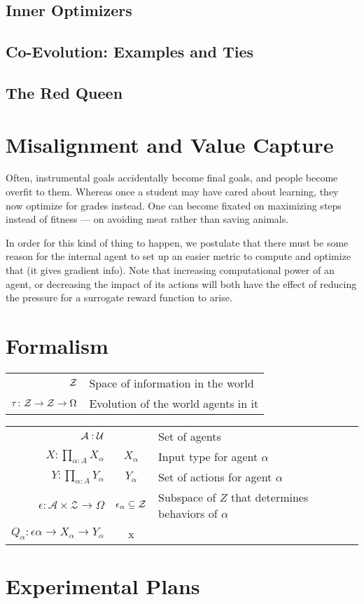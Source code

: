 \documentclass{article}
\theoremstyle{definition}
\newcommand{\Z}{\mathcal Z}
\begin{document}
	\subsection{Inner Optimizers}
	\subsection{Co-Evolution: Examples and Ties}
	\subsection{The Red Queen}
	
	\section{Misalignment and Value Capture}
	Often, instrumental goals accidentally become final goals, and people become overfit to them. Whereas once a student may have cared about learning, they now optimize for grades instead. One can become fixated on maximizing steps instead of fitness --- on avoiding meat rather than saving animals. 
	
	In order for this kind of thing to happen, we postulate that there must be some reason for the internal agent to set up an easier metric to compute and optimize that (it gives gradient info). Note that increasing computational power of an agent, or decreasing the impact of its actions will both have the effect of reducing the pressure for a surrogate reward function to arise. 
	
	
	\section{Formalism}%
	
	\begin{tabular}{r|l}
		$\cal Z$ & Space of information in the world \\
		$\tau\colon {\cal Z \to Z} \to \Omega$ & Evolution of the world agents in it \\
	\end{tabular}
	\vspace{1em}
	
	\begin{tabular}{r|c|l}		
		$\cal A : U$ && Set of agents \\[0.3em]
		$\displaystyle X\colon \prod_{\alpha: A} X_\alpha$ & $X_\alpha$ & Input type for agent $\alpha$ \\[1.7em]
		$\displaystyle Y\colon \prod_{\alpha: A} Y_\alpha$ &$Y_\alpha$ & Set of actions for agent $\alpha$ \\
		$\displaystyle \epsilon\colon \mathcal A \times \Z \to \Omega $&$\epsilon_\alpha \subseteq \cal Z$ & Subspace of $Z$ that determines behaviors of $\alpha$ \\
		$Q_\alpha\colon \epsilon\alpha \to X_\alpha \to Y_\alpha$ & x 
	\end{tabular}

	\section{Experimental Plans}
	
\end{document}

